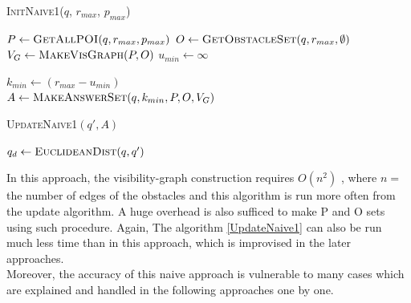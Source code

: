 \documentclass{sig-alternate}
\begin{document}
\DontPrintSemicolon

\begin{algorithm}
\caption{\textsc{InitNaive1}($q$, $r_{max}$, $p_{max}$)}
	
	 $P \gets \textsc{GetAllPOI}(q, r_{max}, p_{max})$ \;
	 $O \gets \textsc{GetObstacleSet}(q, r_{max}, \emptyset)$ \;
	 $V_G \gets \textsc{MakeVisGraph}(P, O)$ \;
	 $u_{min} \gets \infty$\;
	
	$k_{min} \gets (r_{max} - u_{min})$ \\
	\Return $A \gets \textsc{MakeAnswerSet}(q, k_{min}, P, O, V_G)$ \;
\end{algorithm}

\begin{algorithm}
\caption{\textsc{UpdateNaive1}$(q', A)$}

    
     $q_d \gets \textsc{EuclideanDist}(q, q')$\;
\label{UpdateNaive1}
\end{algorithm}


In this approach, the visibility-graph construction requires $O(n^2)$ \cite{mur}, where $n =$ the number of edges of the obstacles and this algorithm is run more often from the update algorithm. A huge overhead is also sufficed to make P and O sets using such procedure. Again, The algorithm \ref{UpdateNaive1} can also be run much less time than in this approach, which is improvised in the later approaches.
\\Moreover, the accuracy of this naive approach is vulnerable to many cases which are explained and handled in the following approaches one by one.
\end{document}
